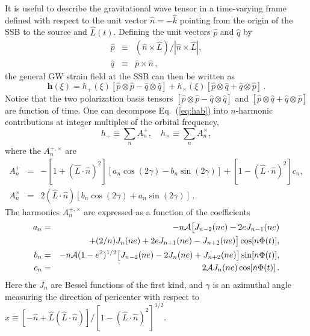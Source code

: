 \documentclass[12pt]{iopart}
\def\be{\begin{equation}}
\def\ee{\end{equation}}
\begin{document}
It is useful to describe the gravitational wave tensor in a time-varying frame defined with respect to the unit vector ${\hat n} = -{\hat k}$ pointing from the origin of the SSB to the source and ${ \hat L}(t)$. Defining the unit vectors 
${ \hat p}$ and ${ \hat q}$ by
\begin{eqnarray} \label{pq}
{ \hat p} &\equiv& ({ \hat n}\times { \hat L})/
                    |{ \hat n}\times { \hat L}|, \nonumber\\
{ \hat q} &\equiv& { \hat p} \times { \hat n}\,,
\end{eqnarray}
the general GW strain field at the SSB can then be written as
%
\begin{equation}
\label{eq:hab}
\mathbf{h}(\xi) = h_{+}(\xi) \left[ \hat{p}\otimes \hat{p} - \hat{q}\otimes \hat{q} \right] + h_{\times}(\xi) \left[ \hat{p}\otimes \hat{q} + \hat{q}\otimes \hat{p} \right]\,.
\end{equation}
%
Notice that the two polarization basis tensors $[ \hat{p}\otimes \hat{p} - \hat{q}\otimes \hat{q}]$  and $[ \hat{p}\otimes \hat{q} + \hat{q}\otimes \hat{p}]$ are function of time. 
One can decompose Eq.\ (\ref{eq:hab}) into $n$-harmonic contributions at integer multiples of the orbital frequency,
\be
h_{+}\equiv \sum_n A^{+}_n, \quad h_{\times}\equiv \sum_n A^{\times}_n,
\label{harmonics}
\ee
where the $A^{+,\times}_n$ are
\begin{eqnarray} \label{A}
A^{+}_n &=&-[1+({ \hat L}\cdot{ \hat n})^2]\left[
a_n\cos(2\gamma)-b_n\sin(2\gamma)\right]
+[1-({ \hat L}\cdot{ \hat n})^2]c_n, \nonumber\\
A^{\times}_n&=& 2({ \hat L}\cdot{ \hat n})\left[
b_n \cos(2\gamma)+a_n \sin(2\gamma)\right]\,.
\end{eqnarray}
The harmonics $A^{+,\times}_n$ are expressed as a function of the coefficients
\begin{eqnarray} \label{abc}
a_n &=& - n{\cal A}\bigl[J_{n-2}(ne)-2eJ_{n-1}(ne) \nonumber \\
       && +(2/n)J_n(ne) +2eJ_{n+1}(ne)-J_{n+2}(ne)\bigr]\cos[n\Phi(t)],
\nonumber\\
b_n &=& - n{\cal A}(1-e^2)^{1/2}\bigl[J_{n-2}(ne)-2J_{n}(ne)
+J_{n+2}(ne)\bigr]\sin[n \Phi(t)],
\nonumber\\
c_n &=& 2{\cal A}J_n(ne)\cos[n\Phi(t)]\,.
\end{eqnarray}
Here the $J_n$ are Bessel functions of the first kind, and $\gamma$ is an azimuthal angle measuring the direction of pericenter with respect to $\hat x \equiv [-\hat n + \hat L (\hat L\cdot \hat n)]/[1-(\hat L\cdot \hat n)^2]^{1/2}$.
\end{document}
